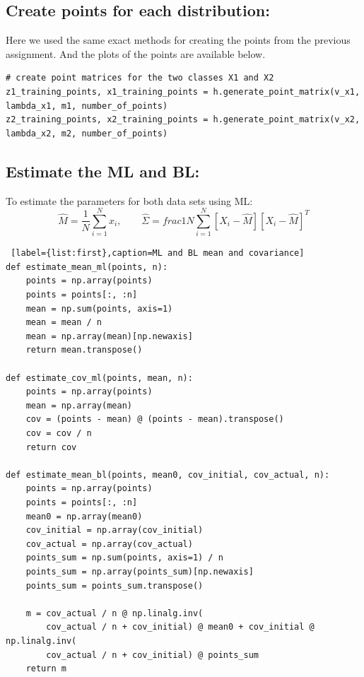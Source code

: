 \documentclass[11pt, oneside]{article}   	%
\begin{document}
\subsection{Create points for each distribution:}

Here we used the same exact methods for creating the points from the previous assignment.
And the plots of the points are available below.

\begin{lstlisting}[label={list:first},caption=points generation]
# create point matrices for the two classes X1 and X2
z1_training_points, x1_training_points = h.generate_point_matrix(v_x1, lambda_x1, m1, number_of_points)
z2_training_points, x2_training_points = h.generate_point_matrix(v_x2, lambda_x2, m2, number_of_points)
\end{lstlisting}



\subsection{Estimate the ML and BL:}

To estimate the parameters for both data sets using ML:
$$ \hat{M}=\frac{1}{N} \sum_{i=1}^{N} x_i, \quad\quad \hat{\Sigma}=	 frac{1}{N} \sum_{i=1}^{N}[X_i-\hat{M}][X_i-\hat{M}]^T$$


\begin{lstlisting} [label={list:first},caption=ML and BL mean and covariance]
def estimate_mean_ml(points, n):
    points = np.array(points)
    points = points[:, :n]
    mean = np.sum(points, axis=1)
    mean = mean / n
    mean = np.array(mean)[np.newaxis]
    return mean.transpose()

def estimate_cov_ml(points, mean, n):
    points = np.array(points)
    mean = np.array(mean)
    cov = (points - mean) @ (points - mean).transpose()
    cov = cov / n
    return cov

def estimate_mean_bl(points, mean0, cov_initial, cov_actual, n):
    points = np.array(points)
    points = points[:, :n]
    mean0 = np.array(mean0)
    cov_initial = np.array(cov_initial)
    cov_actual = np.array(cov_actual)
    points_sum = np.sum(points, axis=1) / n
    points_sum = np.array(points_sum)[np.newaxis]
    points_sum = points_sum.transpose()

    m = cov_actual / n @ np.linalg.inv(
        cov_actual / n + cov_initial) @ mean0 + cov_initial @ np.linalg.inv(
        cov_actual / n + cov_initial) @ points_sum
    return m
\end{lstlisting}
\end{document}
